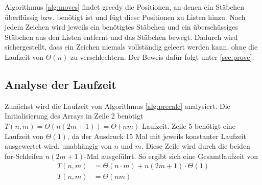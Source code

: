 \documentclass[a4paper,10pt,ngerman]{scrartcl}
\begin{document}
Algorithmus \ref{alg:moves} findet greedy die Positionen, an denen ein Stäbchen überflüssig bzw. benötigt ist und fügt diese Positionen zu Listen hinzu. Nach jedem Zeichen wird jeweils ein benötigtes Stäbchen und ein überschüssiges Stäbchen aus den Listen entfernt und das Stäbchen bewegt. Dadurch wird sichergestellt, dass ein Zeichen niemals vollständig geleert werden kann, ohne die Laufzeit von $\Theta(n)$ zu verschlechtern. Der Beweis dafür folgt unter \ref{sec:prove}.

\subsection{Analyse der Laufzeit}
Zunächst wird die Laufzeit von Algorithmus \ref{alg:precalc} analysiert.
Die Initialisierung des Arrays in Zeile 2 benötigt $T(n, m) = \Theta(n (2m+1)) = \Theta(nm)$ Laufzeit.
Zeile 5 benötigt eine Laufzeit von $\Theta(1)$, da der Ausdruck 15 Mal mit jeweils konstanter Laufzeit ausgewertet wird, unabhängig von $n$ und $m$.
Diese Zeile wird durch die beiden for-Schleifen $n(2m+1)$-Mal ausgeführt. 
So ergibt sich eine Gesamtlaufzeit von 
\begin{align*}
    T(n, m) &= \Theta(n \cdot m) + n(2m+1) \cdot \Theta(1)\\
    T(n, m) &= \Theta(nm)
\end{align*}
\end{document}
